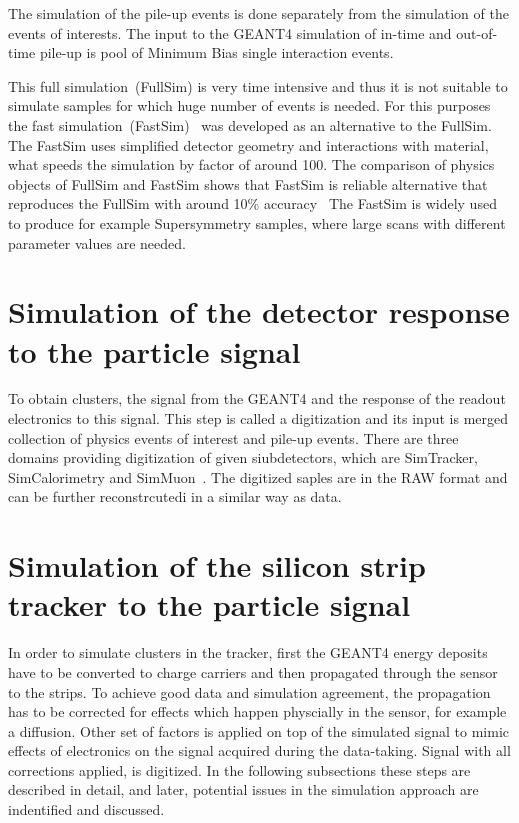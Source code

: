The simulation of the pile-up events is done separately from the simulation of the events of interests. The input to  the GEANT4 simulation of in-time and out-of-time pile-up is pool of Minimum Bias single interaction events.

This full simulation~(FullSim) is very time intensive and thus it is not suitable to simulate samples for which huge number of events is needed. For this purposes the fast simulation~(FastSim)~\cite{Sekmen:2017hzs, CMS:2010spa, Giammanco:2014bza} was developed as an alternative to the FullSim. The FastSim uses simplified detector geometry and interactions with material, what speeds the simulation by factor of around 100. The comparison of physics objects of FullSim and FastSim shows that FastSim is reliable alternative that reproduces the FullSim with around 10\% accuracy~\cite{Abdullin:2011zz, Sekmen:2017hzs} The FastSim is widely used to produce for example Supersymmetry samples, where large scans with different parameter values are needed. 

\section{Simulation of the detector response to the particle signal}

To obtain clusters, the signal from the GEANT4 and the response of the readout electronics to this signal. This step is called a digitization and its input is merged collection of physics events of interest and pile-up events. There are three domains providing digitization of given siubdetectors, which are SimTracker, SimCalorimetry and SimMuon~\cite{iwebsite:simdigi}. The digitized saples are in the RAW format and can be further reconstrcutedi in a similar way as data.

\section{Simulation of the silicon strip tracker to the particle signal}

In order to simulate clusters in the tracker, first the GEANT4 energy deposits have to be converted to charge carriers and then propagated through the sensor to the strips. To achieve good data and simulation agreement, the propagation has to be corrected for effects which happen physcially in the sensor, for example a diffusion. Other set of factors is applied on top of the simulated signal to mimic effects of electronics on the signal acquired during the data-taking. Signal with all corrections applied, is digitized. In the following subsections these steps are described in detail, and later, potential issues in the simulation approach are indentified and discussed.  

